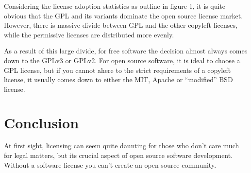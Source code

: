 \documentclass[12pt,letterpaper]{article}
\begin{document}
Considering the license adoption statistics as outline in figure 1, it is quite obvious that the GPL and its variants dominate the open source license market. However, there is massive divide between GPL and the other copyleft licenses, while the permissive licenses are distributed more evenly.

As a result of this large divide, for free software the decision almost always comes down to the GPLv3 or GPLv2. For open source software, it is ideal to choose a GPL license, but if you cannot ahere to the strict requirements of a copyleft license, it usually comes down to either the MIT, Apache or ``modified'' BSD license.

\section{Conclusion}
At first sight, licensing can seem quite daunting for those who don't care much for legal matters, but its crucial aspect of open source software development. Without a software license you can't create an open source community.

\newpage
\end{document}
